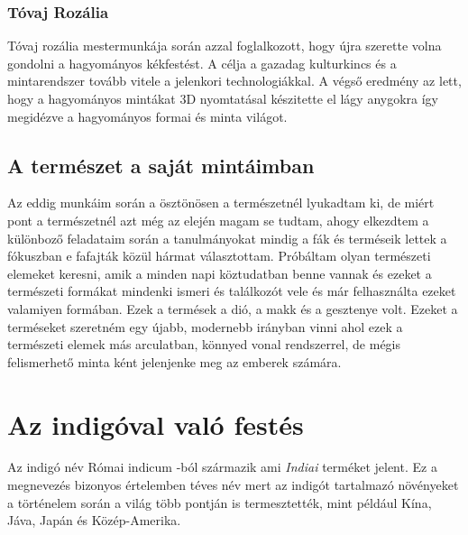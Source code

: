 \documentclass[fontsize=12pt, appendixprefix=true]{scrreprt}
\begin{document}
\subsection{Tóvaj Rozália}
Tóvaj rozália mestermunkája során azzal foglalkozott, hogy újra szerette volna gondolni a hagyományos kékfestést. A célja a gazadag kulturkincs és a mintarendszer tovább vitele a jelenkori technologiákkal. A végső eredmény az lett, hogy a hagyományos mintákat 3D nyomtatásal készitette el lágy anygokra így megidézve a hagyományos formai és minta világot.
\section{A természet a saját mintáimban}
Az eddig munkáim során a ösztönösen a természetnél lyukadtam ki, de miért pont a természetnél azt még az elején magam se tudtam, ahogy elkezdtem a különboző feladataim során a tanulmányokat mindig a fák és terméseik lettek a fókuszban e fafajták közül hármat választottam.
Próbáltam olyan természeti elemeket keresni, amik a minden napi köztudatban benne vannak és ezeket a természeti formákat mindenki ismeri és találkozót vele és már felhasználta ezeket valamiyen formában. 
Ezek a termések a dió, a makk és a gesztenye volt.
Ezeket a terméseket szeretném egy újabb, modernebb irányban vinni ahol ezek a természeti elemek más arculatban, könnyed vonal rendszerrel, de mégis felismerhető minta ként jelenjenke meg az emberek számára.

 
\chapter{Az indigóval való festés}
Az indigó név Római indicum -ból származik ami \textit{Indiai} terméket jelent.
Ez a megnevezés bizonyos értelemben téves név mert az indigót tartalmazó növényeket a történelem során a világ több pontján is termesztették, mint például Kína, Jáva, Japán és Közép-Amerika.  
\end{document}
